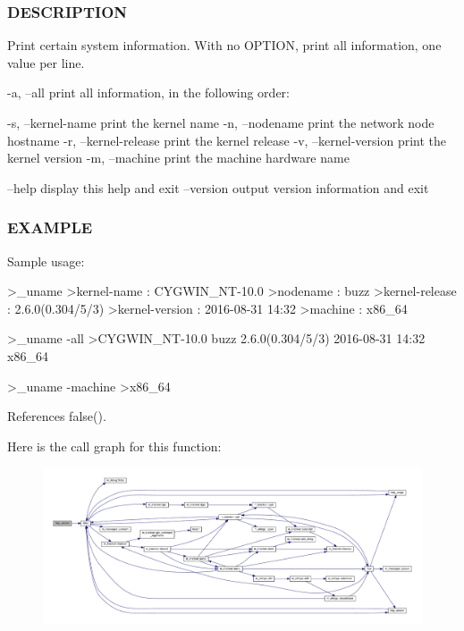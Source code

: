 \subsubsection*{D\+E\+S\+C\+R\+I\+P\+T\+I\+ON}

Print certain system information. With no O\+P\+T\+I\+ON, print all information, one value per line.

-\/a, --all print all information, in the following order\+:

-\/s, --kernel-\/name print the kernel name -\/n, --nodename print the network node hostname -\/r, --kernel-\/release print the kernel release -\/v, --kernel-\/version print the kernel version -\/m, --machine print the machine hardware name

--help display this help and exit --version output version information and exit \subsubsection*{E\+X\+A\+M\+P\+LE}

Sample usage\+: \begin{DoxyVerb}>_uname
>kernel-name    : CYGWIN_NT-10.0
>nodename       : buzz
>kernel-release : 2.6.0(0.304/5/3)
>kernel-version : 2016-08-31 14:32
>machine        : x86_64

>_uname -all
>CYGWIN_NT-10.0 buzz 2.6.0(0.304/5/3) 2016-08-31 14:32 x86_64

>_uname -machine
>x86_64 \end{DoxyVerb}
 

References false().

Here is the call graph for this function\+:
\nopagebreak
\begin{figure}[H]
\begin{center}
\leavevmode
\includegraphics[width=350pt]{__uname_8f90_a39c21619b08a3c22f19e2306efd7f766_cgraph}
\end{center}
\end{figure}
\mbox{\label{__uname_8f90_a483d2219923eccf493a883fceee5a424}} 
